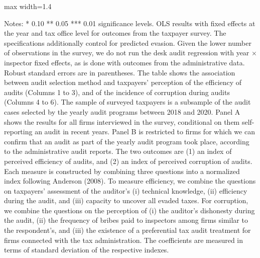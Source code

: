 \documentclass{article}
\newcommand{\OutPath}{Output/}%
\newcommand{\OutPath}{../Output/}%
\begin{document}
\begin{table}[H]\centering
\begin{adjustbox}{max width=1.4\textwidth}
\begin{threeparttable}
\caption{Algorithm Selection, Perceived Audit Efficiency and Corruption, with Predicted Evasion Control}
\label{tab:table6_indices_yhatrf_control}

\footnotesize


\begin{tablenotes}[flushleft]
\footnotesize
\item Notes: * 0.10 ** 0.05 *** 0.01 significance levels. OLS results with fixed effects at the year and tax office level for outcomes from the taxpayer survey. The specifications additionally control for predicted evasion. Given the lower number of observations in the survey, we do not run the desk audit regression with year $\times$ inspector fixed effects, as is done with outcomes from the administrative data. Robust standard errors are in parentheses. The table shows the association between audit selection method and taxpayers' perception of the efficiency of audits (Columns 1 to 3), and of the incidence of corruption during audits (Columns 4 to 6). The sample of surveyed taxpayers is a subsample of the audit cases selected by the yearly audit programs between 2018 and 2020. Panel A shows the results for all firms interviewed in the survey, conditional on them self-reporting an audit in recent years. Panel B is restricted to firms for which we can confirm that an audit as part of the yearly audit program took place, according to the administrative audit reports. The two outcomes are (1) an index of perceived efficiency of audits, and (2) an index of perceived corruption of audits. Each measure is constructed by combining three questions into a normalized index following Anderson (2008). To measure efficiency, we combine the questions on taxpayers' assessment of the auditor's (i) technical knowledge, (ii) efficiency during the audit, and (iii) capacity to uncover all evaded taxes. For corruption, we combine the questions on the perception of (i) the auditor's dishonesty during the audit, (ii) the frequency of bribes paid to inspectors among firms similar to the respondent's, and (iii) the existence of a preferential tax audit treatment for firms connected with the tax administration. The coefficients are measured in terms of standard deviation of the respective indexes.
\end{tablenotes}
\end{threeparttable}
\end{adjustbox}
\end{table}
\end{document}
